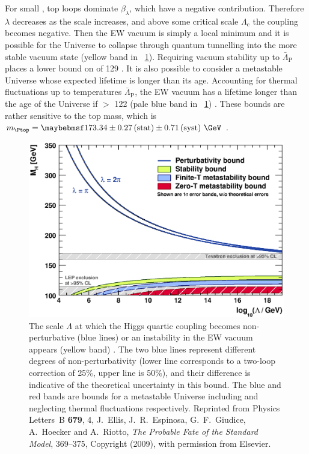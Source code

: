 For small \mH, top loops dominate $\beta_{\lambda}$, which have a negative 
contribution. Therefore $\lambda$ decreases as the scale increases, and above some 
critical scale $\Lambda_{\text{c}}$ the coupling becomes negative. Then the EW 
vacuum is simply a local minimum and it is possible for the Universe to collapse through
quantum tunnelling into the more stable vacuum state (yellow band in 
\Figure~\ref{fig:theory_constraints}). Requiring vacuum stability up to 
$\bar{\Lambda}_{\text{P}}$ places a lower bound on \mH of \unit{129}{\GeV} 
\cite{Ellis:2009}. 
It is also possible to consider a metastable Universe whose expected lifetime is longer 
than its age. Accounting for thermal fluctuations up to temperatures 
\about$\bar{\Lambda}_{\text{P}}$, the EW vacuum has a lifetime longer than the age 
of the Universe if \mH $>$ \unit{122}{\GeV} (pale blue band in 
\Figure~\ref{fig:theory_constraints}) \cite{Ellis:2009}. These bounds are rather 
sensitive to the top mass, which is 
$m_{\Ptop} = \statsyst{173.34}{0.27}{0.71}~\GeV$ \cite{TopMass}.

\begin{figure}[t]
	\includegraphics[width=\mediumfigwidth]{tex/motivation/theory_constraints}
	\caption{The scale $\Lambda$ at which the Higgs quartic coupling becomes 
	non-perturbative (blue lines) or an instability in the EW vacuum appears
	(yellow band) \cite{Ellis:2009}. The two blue lines represent different degrees of 
	non-perturbativity (lower line corresponds to a two-loop correction of 25\%, upper 
	line is 50\%), and their difference is indicative of the theoretical uncertainty in 
	this bound. The blue and red bands are bounds for a metastable Universe including and
	neglecting thermal fluctuations respectively. Reprinted from Physics Letters~B \textbf{679}, 4,
	J.~Ellis, J.~R.~Espinosa, G.~F.~Giudice, A.~Hoecker and A.~Riotto, \textit{The Probable 
	Fate of the Standard Model}, 369--375, Copyright (2009), with permission from Elsevier.}
	\label{fig:theory_constraints}
\end{figure}
